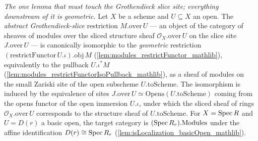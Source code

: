 
\begin{lemma}\leanok
  \label{lem:over_restrict_iso}
  \textit{The one lemma that must touch the Grothendieck slice site; everything downstream of it is
  geometric.}
  Let \(X\) be a scheme and \(U \subseteq X\) an open. The \emph{abstract Grothendieck-slice}
  restriction \(M.\mathrm{over}\,U\) — an object of the category of sheaves of modules over the
  sliced structure sheaf \(\mathcal{O}_X.\mathrm{over}\,U\) on the slice site \(J.\mathrm{over}\,U\) —
  is canonically isomorphic to the \emph{geometric} restriction
  \((\mathrm{restrictFunctor}\,U.\iota).\mathrm{obj}\,M\)
  (\cref{lem:modules_restrictFunctor_mathlib}), equivalently to the pullback \(U.\iota^{*} M\)
  (\cref{lem:modules_restrictFunctorIsoPullback_mathlib}), as a sheaf of modules on the small Zariski
  site of the open subscheme \(U.\mathrm{toScheme}\). The isomorphism is induced by the equivalence
  of sites \(J.\mathrm{over}\,U \simeq \mathrm{Opens}(U.\mathrm{toScheme})\) coming from the opens
  functor of the open immersion \(U.\iota\), under which the sliced sheaf of rings
  \(\mathcal{O}_X.\mathrm{over}\,U\) corresponds to the structure sheaf of \(U.\mathrm{toScheme}\).
  For \(X = \operatorname{Spec} R\) and \(U = D(r)\) a basic open, the target category is
  \((\operatorname{Spec} R_r).\mathrm{Modules}\) under the affine identification \(D(r) \cong \operatorname{Spec} R_r\)
  (\cref{lem:isLocalization_basicOpen_mathlib}).
\end{lemma}
